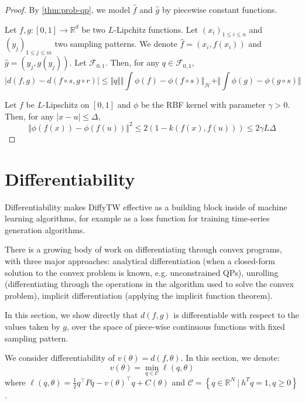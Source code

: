 \begin{proof}
By \cref{thm:prob-qp}, we model $\hat f$ and $\hat g$ by piecewise constant functions.

Let $f,g:[0,1] \to \mathbb R^d$ be two $L$-Lipchitz functions. Let $(x_i)_{1\leq i \leq n}$ and $(y_j)_{1\leq j\leq m}$ two sampling patterns. We denote $\hat f = (x_i, f(x_i))$ and $\hat g = (y_j, g(y_j))$.
Let $\mathcal F_{0,1}$. Then, for any $q\in\mathcal F_{0,1}$,
    \begin{equation}
        \vert d(f, g) - d(f\circ s, g\circ r) \vert \leq \Vert q \Vert \Vert \int \phi(f) - \phi(f\circ s)\Vert_{\mathcal H} + \Vert \int \phi(g)- \phi(g\circ s)\Vert
    \end{equation}


Let $f$ be $L$-Lipschitz on $[0,1]$ and $\phi$ be the RBF kernel with parameter $\gamma > 0$.
Then, for any $\vert x - u \vert \leq \Delta$,
\begin{equation}
    \Vert \phi(f(x)) - \phi(f(u)) \Vert^2 \leq 2\left(1 - k(f(x), f(u))\right) \leq 2 \gamma L \Delta
\end{equation}
\end{proof}




\section{Differentiability}
Differentiability makes DiffyTW effective as a building block inside of machine learning algorithms, for example as a loss function for training time-series generation algorithms.

There is a growing body of work on differentiating through convex programs, with three major approaches: analytical differentiation (when a closed-form solution to the convex problem is known, e.g. unconstrained QPs), unrolling (differentiating through the operations in the algorithm used to solve the convex problem), implicit differentiation (applying the implicit function theorem).

In this section, we show directly that $d(f, g)$ is differentiable with respect to the values taken by $g$, over the space of piece-wise continuous functions with fixed sampling pattern.

We consider differentiability of $v(\theta) = d(f, \theta)$. In this section, we denote:
\begin{equation}\label{prob:fullqp}
    v(\theta) = \min_{q\in\mathcal C} \ell(q, \theta)
\end{equation}
where $\ell(q, \theta) = \frac{1}{2} q^\top Pq - v(\theta)^\top q + C(\theta)$ and $\mathcal C = \left\lbrace q\in\mathbb R^N ~\vert~ h^Tq=1, q \geq 0\right\rbrace$.


